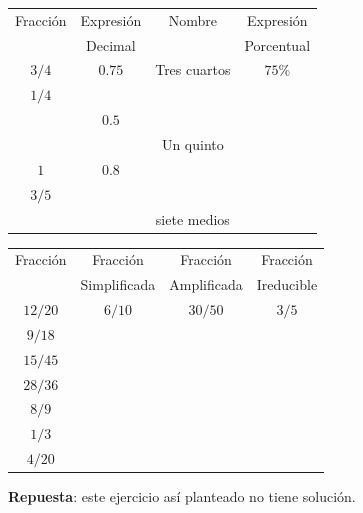 \documentclass[11pt]{examdesign}
\begin{document}
\begin{shortanswer}[title={Completar los siguientes cuadros siguiendo el ejemplo dado:},
    	rearrange=no,resetcounter=no]
\begin{question}
\begin{multicols}{2}
        		\begin{tabular}{|c|c|c|c|}
        			\hline
        			{\scriptsize Fracción}      &{\scriptsize Expresión}&{\scriptsize Nombre}	 &{\scriptsize Expresión}
        			\\
        			&{\scriptsize Decimal}     &            &{\scriptsize Porcentual}
        			\\\hline
        			$3/4$ & $0.75$  & Tres cuartos&$75\%$
        			\\\hline
        			$1/4$ &         &           &             
        			\\\hline
        			& $0.5$   &           &
        			\\\hline
        			&         & Un quinto&
        			\\\hline
        			$1$           & $0.8$   &           &
        			\\\hline
        			$3/5$ &         &           &
        			\\\hline
        			&         &{\scriptsize siete medios}&
        			\\\hline
        		\end{tabular}
        		\begin{tabular}{|c|c|c|c|}
        			\hline
        			{\scriptsize Fracción}      &{\scriptsize Fracción}     &{\scriptsize Fracción}	 &{\scriptsize Fracción}
        			\\
        			&{\scriptsize Simplificada} &{\scriptsize Amplificada} &{\scriptsize Ireducible}
        			\\\hline
        			$12/20$  & $6/10$  &$30/50$  & $3/5$
        			\\\hline
        			$9/18$   &         &         &             
        			\\\hline
        			$15/45$  &         &         &
        			\\\hline
        			$28/36$  &         &         &
        			\\\hline
        			$8/9$    &         &         &
        			\\\hline
        			$1/3$    &         &         &
        			\\\hline
        			$4/20$   &         &         &
        			\\\hline
        		\end{tabular}
        	\end{multicols}
        	\begin{answer}
        		\textbf{Repuesta}: este ejercicio así planteado no tiene solución.
        	\end{answer}
        \end{question}        
    \end{shortanswer}
    
\end{document}
